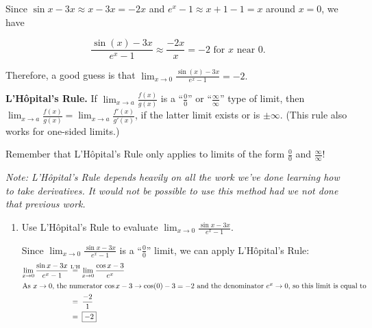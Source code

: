 \documentclass[main]{subfiles}
\begin{document}
\begin{enumerate}
\begin{enumerate}
    \begin{solution}
      Since $\sin x - 3x \approx x -3x = -2x$ and $e^x-1 \approx x+1 -1 = x$ around $x=0$, we have
      
\[\frac{\sin
        (x) - 3x}{{e^x} - 1} \approx \frac{-2x}{x} = -2  \text{ for $x$ near $0$}.\]
      
      Therefore, a good guess is that $\displaystyle \lim_{x \to 0}
      \frac{\sin (x) - 3x}{e^{x} -1} = -2.$
    \end{solution}

  \end{enumerate}

\pspace{\newpage}

    \begin{framed}
      \textbf{L'Hôpital's Rule.}  If $\displaystyle \lim_{x \to a}
      \frac{f(x)}{g(x)}$ is a ``$\displaystyle \frac{0}{0}$'' or
      ``$\displaystyle \frac{\infty}{\infty}$'' type of limit, then
      $\displaystyle \lim_{x \to a} \frac{f(x)}{g(x)} = \lim_{x \to a}
      \frac{f'(x)}{g'(x)}$, if the latter limit exists or is $\pm \infty$.
      (This rule also works for one-sided limits.)

      {\Large{}} Remember that L'Hôpital's Rule only applies to
      limits of the form $\frac{0}{0}$ and $\frac{\infty}{\infty}$!

      \emph{Note: L'Hôpital's Rule depends heavily on all the work we've
      done learning how to take derivatives. It would not be possible
      to use this method had we not done that previous work.}
    \end{framed}

  \begin{enumerate}[resume]
  \item
    \begin{problem}[\stretch{1.5}]
      Use L'Hôpital's Rule to evaluate $\displaystyle \lim_{x
        \to 0} \frac{\sin x - 3x}{e^x - 1}$.
    \end{problem}

    \begin{solution}
      Since $\displaystyle \lim_{x
        \to 0} \frac{\sin x - 3x}{e^x - 1}$ is a 
        ``$\frac{0}{0}$'' limit, we can
      apply L'Hôpital's Rule:
      \begin{align*}
        \displaystyle \lim_{x
        \to 0} \frac{\sin x - 3x}{e^x - 1}
        &\lheq \lim_{x \to 0} \frac{\cos x - 3}{e^x}\\
        \intertext{As $x \to 0$, the numerator 
        $\cos x - 3 \to \cos(0) - 3 = -2$ and the denominator 
        $e^x \to 0$, so this limit is equal to}
        & \nolheq \frac{-2}{1} \\
        & \nolheq \boxed{-2}
      \end{align*}
    \end{solution}
  \end{enumerate}


\end{enumerate}
\end{document}
